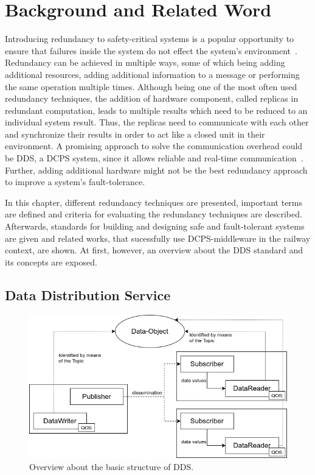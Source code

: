 \chapter{Background and Related Word}
\label{chptr:concepts}

Introducing redundancy to safety-critical systems is a popular opportunity to ensure that failures inside the system do not effect the system's environment~\cite{BarryFaultToleranceAnalysis}.
Redundancy can be achieved in multiple ways, some of which being adding additional resources, adding additional information to a message or performing the same operation multiple times.
Although being one of the most often used redundancy techniques, the addition of hardware component, called replicas in redundant computation, leads to multiple results which need to be reduced to an individual system result.
Thus, the replicas need to communicate with each other and synchronize their results in order to act like a closed unit in their environment.
A promising approach to solve the communication overhead could be \gls*{DDS}, a \gls*{DCPS} system, since it allows reliable and real-time communication~\cite{omgDDSspec}.
Further, adding additional hardware might not be the best redundancy approach to improve a system's fault-tolerance.

In this chapter, different redundancy techniques are presented, important terms are defined and criteria for evaluating the redundancy techniques are described.
Afterwards, standards for building and designing safe and fault-tolerant systems are given and related works, that sucessfully use \gls*{DCPS}-middleware in the railway context, are shown.
At first, however, an overview about the \gls*{DDS} standard and its concepts are exposed.



\section{Data Distribution Service}

\begin{figure}[!hb]
	\centering
	\includegraphics[width=0.75\linewidth]{images/DDSStructure}
	\caption{Overview about the basic structure of \gls*{DDS}.}
	\label{fig:DDSStructure}
\end{figure}


